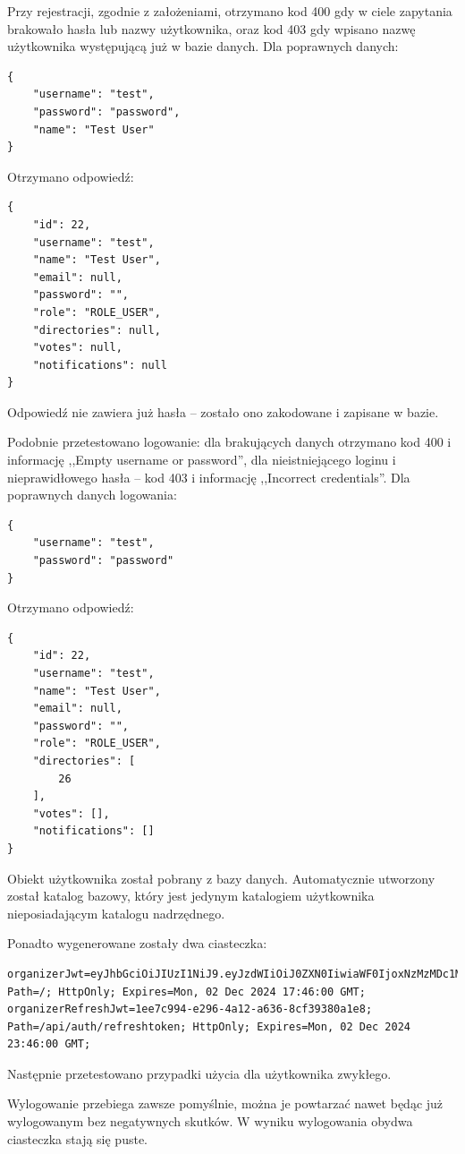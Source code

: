 \documentclass[a4paper,twoside,12pt]{book}
\begin{document}
Przy rejestracji, zgodnie z założeniami, otrzymano kod 400 gdy w ciele zapytania brakowało hasła lub nazwy użytkownika, oraz kod 403 gdy wpisano nazwę użytkownika występującą już w bazie danych. Dla poprawnych danych:
\begin{verbatim}
{
	"username": "test",
	"password": "password",
	"name": "Test User"
}
\end{verbatim}
Otrzymano odpowiedź:
\begin{verbatim}
{
	"id": 22,
	"username": "test",
	"name": "Test User",
	"email": null,
	"password": "",
	"role": "ROLE_USER",
	"directories": null,
	"votes": null,
	"notifications": null
}
\end{verbatim}
Odpowiedź nie zawiera już hasła -- zostało ono zakodowane i zapisane w bazie.

Podobnie przetestowano logowanie: dla brakujących danych otrzymano kod 400 i informację ,,Empty username or password'', dla nieistniejącego loginu i nieprawidłowego hasła -- kod 403 i informację ,,Incorrect credentials''. Dla poprawnych danych logowania:
\begin{verbatim}
{
	"username": "test",
	"password": "password"
}
\end{verbatim}
Otrzymano odpowiedź:
\begin{verbatim}
{
	"id": 22,
	"username": "test",
	"name": "Test User",
	"email": null,
	"password": "",
	"role": "ROLE_USER",
	"directories": [
		26
	],
	"votes": [],
	"notifications": []
}
\end{verbatim}
Obiekt użytkownika został pobrany z bazy danych. Automatycznie utworzony został katalog bazowy, który jest jedynym katalogiem użytkownika nieposiadającym katalogu nadrzędnego.

Ponadto wygenerowane zostały dwa ciasteczka:
\begin{verbatim}
organizerJwt=eyJhbGciOiJIUzI1NiJ9.eyJzdWIiOiJ0ZXN0IiwiaWF0IjoxNzMzMDc1MTYxLCJleHAiOjE3MzMxNjE1NjF9.UOpUtCw0G1TgcEf9ufIk2T00JqQ8ARo61cZJnYslPdU; Path=/; HttpOnly; Expires=Mon, 02 Dec 2024 17:46:00 GMT;
organizerRefreshJwt=1ee7c994-e296-4a12-a636-8cf39380a1e8; Path=/api/auth/refreshtoken; HttpOnly; Expires=Mon, 02 Dec 2024 23:46:00 GMT;
\end{verbatim}

Następnie przetestowano przypadki użycia dla użytkownika zwykłego.

Wylogowanie przebiega zawsze pomyślnie, można je powtarzać nawet będąc już wylogowanym bez negatywnych skutków. W wyniku wylogowania obydwa ciasteczka stają się puste.
\end{document}
